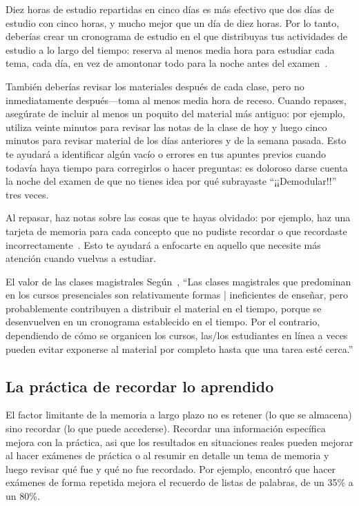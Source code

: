 Diez horas de estudio repartidas en cinco días
es más efectivo que dos días de estudio con cinco horas,
y mucho mejor que un día de diez horas.
Por lo tanto, deberías crear un cronograma de estudio en el que distribuyas tus actividades de estudio a lo largo del tiempo:
reserva al menos media hora para estudiar cada tema, cada día,
en vez de amontonar todo para la noche antes del examen~\cite{Kang2016}.

También deberías revisar los materiales después de cada clase,
pero no inmediatamente después---toma al menos media hora de receso.
Cuando repases,
asegúrate de incluir al menos un poquito del material más antiguo:
por ejemplo,
utiliza veinte minutos para revisar las notas de la clase de hoy
y luego cinco minutos para revisar material de los días anteriores
y de la semana pasada.
Esto te ayudará a identificar algún vacío o errores en tus apuntes previos
cuando todavía haya tiempo para corregirlos o hacer preguntas:
es doloroso darse cuenta la noche del examen
de que no tienes idea por qué subrayaste ``¡¡Demodular!!'' tres veces.

Al repasar,
haz notas sobre las cosas que te hayas olvidado:
por ejemplo,
haz una tarjeta de memoria para cada concepto que no pudiste recordar
o que recordaste incorrectamente~\cite{Matt2019}.
Esto te ayudará a enfocarte en aquello que necesite más atención cuando vuelvas a estudiar.

\begin{aside}{El valor de las clases magistrales}
  Según~\cite{Mill2016a},
  ``Las clases magistrales que predominan en los cursos presenciales son relativamente formas     |   ineficientes de enseñar,
  pero probablemente contribuyen a distribuir el material en el tiempo,
  porque se desenvuelven en un cronograma establecido en el tiempo.
  Por el contrario,
  dependiendo de cómo se organicen los cursos,
  las/los estudiantes en línea a veces pueden evitar exponerse al material por completo hasta que una     tarea esté cerca.''
\end{aside}

\subsection*{La práctica de recordar lo aprendido}

El factor limitante de la memoria a largo plazo no es retener (lo que se almacena)
sino recordar (lo que puede accederse).
Recordar una información específica mejora con la práctica,
asi que los resultados en situaciones reales pueden mejorar
al hacer exámenes de práctica o al resumir en detalle un tema de memoria
y luego revisar qué fue y qué no fue recordado.
Por ejemplo,
\cite{Karp2008} encontró que hacer exámenes de forma repetida mejora el recuerdo de listas de palabras, de un 35\% a un 80\%.

